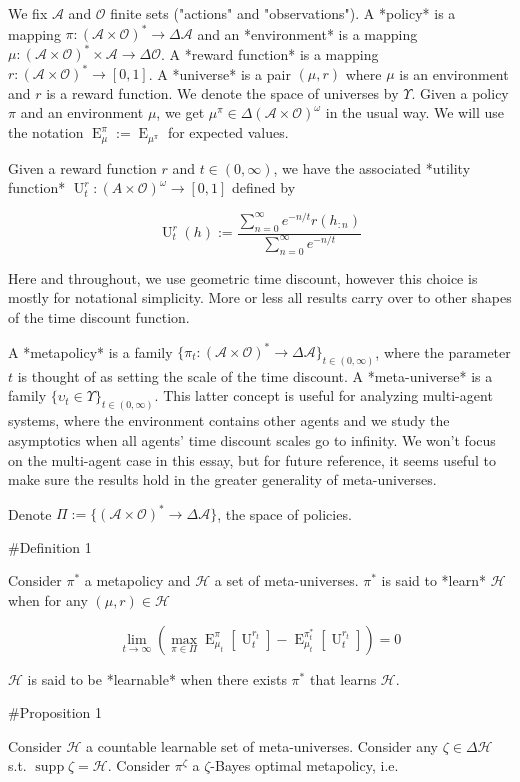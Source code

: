 \documentclass[a4paper]{article}
\DeclareMathOperator{\Supp}{supp}
\DeclareMathOperator{\E}{E}
\newcommand{\Ob}{\mathcal{O}}
\newcommand{\A}{\mathcal{A}}
\newcommand{\Hy}{\mathcal{H}}
\newcommand{\Ut}{\operatorname{U}}
\begin{document}
We fix $\A$ and $\Ob$ finite sets ("actions" and "observations"). A *policy* is a mapping $\pi: (\A \times \Ob)^* \rightarrow \Delta\A$ and an *environment* is a mapping $\mu:(\A \times \Ob)^* \times \A \rightarrow \Delta\Ob$. A *reward function* is a mapping $r: (\A \times \Ob)^* \rightarrow [0,1]$. A *universe* is a pair $(\mu,r)$ where $\mu$ is an environment and $r$ is a reward function. We denote the space of universes by $\Upsilon$. Given a policy $\pi$ and an environment $\mu$, we get $\mu^\pi \in \Delta(\A \times \Ob)^\omega$ in the usual way. We will use the notation $\E_\mu^\pi := \E_{\mu^\pi}$ for expected values.

Given a reward function $r$ and $t \in (0,\infty)$, we have the associated *utility function* $\Ut_t^r: (A \times \Ob)^\omega \rightarrow [0,1]$ defined by

$$\Ut_t^{r}(h):=\frac{\sum_{n=0}^\infty e^{-n/t} r(h_{:n})}{\sum_{n=0}^\infty e^{-n/t}}$$

Here and throughout, we use geometric time discount, however this choice is mostly for notational simplicity. More or less all results carry over to other shapes of the time discount function.

A *metapolicy* is a family $\{\pi_t: (\A \times \Ob)^* \rightarrow \Delta\A\}_{t \in (0, \infty)}$, where the parameter $t$ is thought of as setting the scale of the time discount. A *meta-universe* is a family $\{\upsilon_t \in \Upsilon\}_{t \in (0, \infty)}$. This latter concept is useful for analyzing multi-agent systems, where the environment contains other agents and we study the asymptotics when all agents' time discount scales go to infinity. We won't focus on the multi-agent case in this essay, but for future reference, it seems useful to make sure the results hold in the greater generality of meta-universes.

Denote $\Pi:=\{(\A \times \Ob)^* \rightarrow \Delta\A\}$, the space of policies.

\#Definition 1

Consider $\pi^*$ a metapolicy and $\Hy$ a set of meta-universes. $\pi^*$ is said to *learn* $\Hy$ when for any $(\mu,r) \in \Hy$

$$\lim_{t \rightarrow \infty} (\max_{\pi \in \Pi} \E_{\mu_t}^{\pi}[\Ut_t^{r_t}] - \E_{\mu_t}^{\pi^*_t}[\Ut_t^{r_t}]) = 0$$

$\Hy$ is said to be *learnable* when there exists $\pi^*$ that learns $\Hy$.

\#Proposition 1

Consider $\Hy$ a countable learnable set of meta-universes. Consider any $\zeta \in \Delta\Hy$ s.t. $\Supp \zeta = \Hy$. Consider $\pi^\zeta$ a $\zeta$-Bayes optimal metapolicy, i.e.
\end{document}
